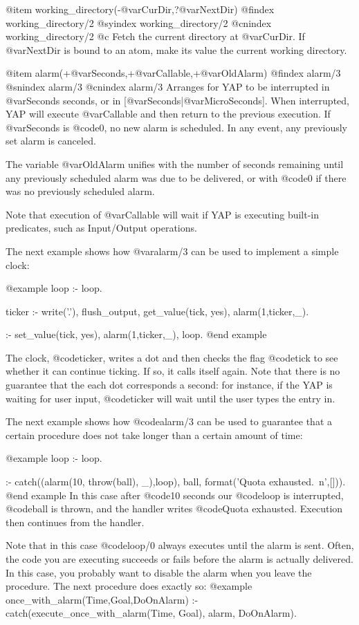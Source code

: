 {{{{{@item working_directory(-@var{CurDir},?@var{NextDir})
@findex  working_directory/2
@syindex working_directory/2
@cnindex working_directory/2    @c 
Fetch the current directory at @var{CurDir}. If @var{NextDir} is bound
to an atom, make its value the current working directory.

@item alarm(+@var{Seconds},+@var{Callable},+@var{OldAlarm})
@findex alarm/3
@snindex alarm/3
@cnindex alarm/3
Arranges for YAP to be interrupted in @var{Seconds} seconds, or in
[@var{Seconds}|@var{MicroSeconds}]. When interrupted, YAP will execute
@var{Callable} and then return to the previous execution. If
@var{Seconds} is @code{0}, no new alarm is scheduled. In any event,
any previously set alarm is canceled.

The variable @var{OldAlarm} unifies with the number of seconds remaining
until any previously scheduled alarm was due to be delivered, or with
@code{0} if there was no previously scheduled alarm.

Note that execution of @var{Callable} will wait if YAP is
executing built-in predicates, such as Input/Output operations.

The next example shows how @var{alarm/3} can be used to implement a
simple clock:

@example
loop :- loop.

ticker :- write('.'), flush_output,
          get_value(tick, yes),
          alarm(1,ticker,_).

:- set_value(tick, yes), alarm(1,ticker,_), loop.
@end example

The clock, @code{ticker}, writes a dot and then checks the flag
@code{tick} to see whether it can continue ticking. If so, it calls
itself again. Note that there is no guarantee that the each dot
corresponds a second: for instance, if the YAP is waiting for
user input, @code{ticker} will wait until the user types the entry in.

The next example shows how @code{alarm/3} can be used to guarantee that
a certain procedure does not take longer than a certain amount of time:

@example
loop :- loop.

:-   catch((alarm(10, throw(ball), _),loop),
        ball,
        format('Quota exhausted.~n',[])).
@end example
In this case after @code{10} seconds our @code{loop} is interrupted,
@code{ball} is thrown,  and the handler writes @code{Quota exhausted}.
Execution then continues from the handler.

Note that in this case @code{loop/0} always executes until the alarm is
sent. Often, the code you are executing succeeds or fails before the
alarm is actually delivered. In this case, you probably want to disable
the alarm when you leave the procedure. The next procedure does exactly so:
@example
once_with_alarm(Time,Goal,DoOnAlarm) :-
   catch(execute_once_with_alarm(Time, Goal), alarm, DoOnAlarm).

}}}}}
